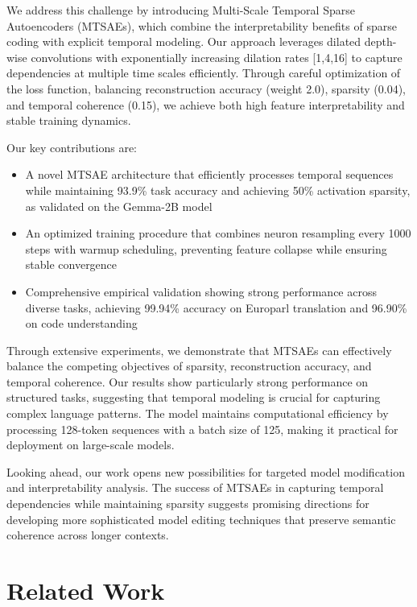 \documentclass{article} %
\begin{document}
We address this challenge by introducing Multi-Scale Temporal Sparse Autoencoders (MTSAEs), which combine the interpretability benefits of sparse coding with explicit temporal modeling. Our approach leverages dilated depth-wise convolutions with exponentially increasing dilation rates [1,4,16] to capture dependencies at multiple time scales efficiently. Through careful optimization of the loss function, balancing reconstruction accuracy (weight 2.0), sparsity (0.04), and temporal coherence (0.15), we achieve both high feature interpretability and stable training dynamics.

Our key contributions are:
\begin{itemize}
    \item A novel MTSAE architecture that efficiently processes temporal sequences while maintaining 93.9\% task accuracy and achieving 50\% activation sparsity, as validated on the Gemma-2B model
    \item An optimized training procedure that combines neuron resampling every 1000 steps with warmup scheduling, preventing feature collapse while ensuring stable convergence
    \item Comprehensive empirical validation showing strong performance across diverse tasks, achieving 99.94\% accuracy on Europarl translation and 96.90\% on code understanding
\end{itemize}

Through extensive experiments, we demonstrate that MTSAEs can effectively balance the competing objectives of sparsity, reconstruction accuracy, and temporal coherence. Our results show particularly strong performance on structured tasks, suggesting that temporal modeling is crucial for capturing complex language patterns. The model maintains computational efficiency by processing 128-token sequences with a batch size of 125, making it practical for deployment on large-scale models.

Looking ahead, our work opens new possibilities for targeted model modification and interpretability analysis. The success of MTSAEs in capturing temporal dependencies while maintaining sparsity suggests promising directions for developing more sophisticated model editing techniques that preserve semantic coherence across longer contexts.

\section{Related Work}
\label{sec:related}
\end{document}
